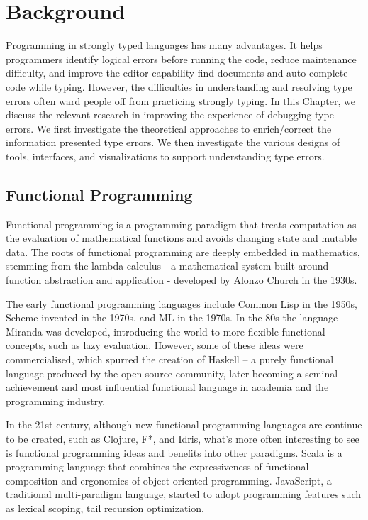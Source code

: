 


\chapter{Background}
\label{chap:background} 

Programming in strongly typed languages has many advantages. It helps programmers identify logical errors before running the code, reduce maintenance difficulty, and improve the editor capability find documents and auto-complete code while typing. However, the difficulties in understanding and resolving type errors often ward people off  from practicing strongly typing.  In this Chapter, we discuss the relevant research in improving the experience of debugging type errors. We first investigate the theoretical approaches to enrich/correct the information presented type errors. We then  investigate the various designs of tools, interfaces, and visualizations to support understanding type errors.

\graphicspath{{Figures/Background}}


\section{Functional Programming}

Functional programming is a programming paradigm that treats computation as the evaluation of mathematical functions and avoids changing state and mutable data. The roots of functional programming are deeply embedded in mathematics, stemming from the lambda calculus - a mathematical system built around function abstraction and application - developed by Alonzo Church in the 1930s.


The early functional programming languages include Common Lisp in the 1950s, Scheme invented in the 1970s, and ML in the 1970s. In the 80s  the language Miranda was developed, introducing the world to more flexible functional concepts, such as lazy evaluation. However, some of these ideas were commercialised, which spurred the creation of Haskell – a purely functional language produced by the open-source community, later becoming a seminal achievement and most influential functional language in academia and the programming industry.


In the 21st century, although new functional programming languages are continue to be created, such as Clojure, F*, and Idris, what’s more often interesting to see is functional programming ideas and benefits into other paradigms. Scala is a programming language that combines the expressiveness of functional composition and ergonomics of object oriented programming. JavaScript, a traditional multi-paradigm language, started to adopt programming features such as lexical scoping, tail recursion optimization.


